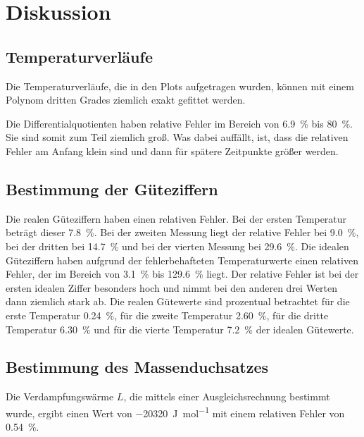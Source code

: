 \section{Diskussion}
\label{sec:Diskussion}

\subsection{Temperaturverläufe}
Die Temperaturverläufe, die in den Plots aufgetragen wurden, können mit einem 
Polynom dritten Grades ziemlich exakt gefittet werden. 

\noindent Die Differentialquotienten haben relative Fehler im Bereich von \SI{6.9}{\percent} 
bis \SI{80}{\percent}. Sie sind somit zum Teil ziemlich groß. Was dabei auffällt, ist, dass die relativen Fehler 
am Anfang klein sind und dann für spätere Zeitpunkte größer werden.

\subsection{Bestimmung der Güteziffern}
Die realen Güteziffern haben einen relativen Fehler. Bei der ersten Temperatur beträgt 
dieser \SI{7.8}{\percent}. Bei der zweiten Messung liegt der relative Fehler bei 
\SI{9.0}{\percent}, bei der dritten bei \SI{14.7}{\percent} und bei der 
vierten Messung bei \SI{29.6}{\percent}. 
Die idealen Güteziffern haben aufgrund der fehlerbehafteten Temperaturwerte einen 
relativen Fehler, der im Bereich von \SI{3.1}{\percent} bis \SI{129.6}{\percent} 
liegt. Der relative Fehler ist bei der ersten idealen Ziffer besonders hoch und nimmt bei den anderen drei Werten dann ziemlich stark ab. %
Die realen Gütewerte sind prozentual betrachtet für die 
erste Temperatur \SI{0.24}{\percent}, für die zweite Temperatur 
\SI{2.60}{\percent}, für die dritte Temperatur \SI{6.30}{\percent} und für die 
vierte Temperatur \SI{7.2}{\percent} der idealen Gütewerte.


\subsection{Bestimmung des Massenduchsatzes}
Die Verdampfungswärme $L$, die mittels einer Ausgleichsrechnung bestimmt wurde, 
ergibt einen Wert von \SI{-20320}{\joule\per\mol} mit einem relativen Fehler von 
\SI{0.54}{\percent}. %

